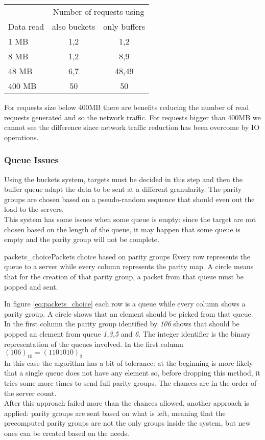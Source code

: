 \vspace{0.5cm}
\begin{tabular}{l | c | c}
    & \multicolumn{2}{|c}{Number of requests using} \\
    Data read & also buckets & only buffers \\ \hline
    1 MB & 1,2 & 1,2 \\
    8 MB & 1,2 & 8,9 \\
    48 MB& 6,7 & 48,49 \\
    400 MB & 50 & 50 \\
\end{tabular}
\vspace{0.5cm}

For requests size below 400MB there are benefits reducing the number of read
requests generated and so the network traffic. For requests bigger than 400MB
we cannot see the difference since network traffic reduction has been overcome
by IO operations.

\subsubsection{Queue Issues}
Using the buckets system, targets must be decided in this step and then the
buffer queue adapt the data to be sent at a different granularity.
The parity groups are chosen based on a pseudo-random sequence that should
even out the load to the servers. \\
This system has some issues when some queue is empty: since the target are
not chosen based on the length of the queue, it may happen that some queue is
empty and the parity group will not be complete. \\

\begin{myimage}{packets_choice}{Packets choice based on parity groups}
    Every row represents the queue to a server while every column represents the
    parity map. A circle means that for the creation of that parity group, a
    packet from that queue must be popped and sent.
\end{myimage}
In figure \ref{eq:packets_choice} each row is a queue while every column shows a parity group.
A circle shows that an element should be picked from that queue. \\
In the first column the parity group identified by \textit{106} shows that
should be popped an element from queue \textit{1,3,5} and \textit{6}. The
integer identifier is the binary representation of the queues involved. In the
first column $(106)_{10} = (1101010)_2$ \\
In this case the algorithm has a bit of tolerance: at the beginning is more
likely that a single queue does not have any element so, before dropping this
method, it tries some more times to send full parity groups. The chances are in
the order of the server count. \\
After this approach failed more than the chances allowed, another approach is applied:
parity groups are sent based on what is left, meaning that the precomputed
parity groups are not the only groups inside the system, but new ones can be
created based on the needs.\\

